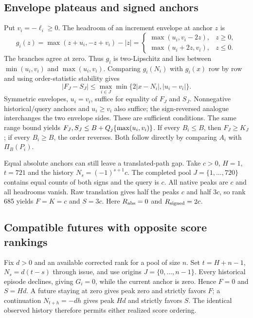 \subsection{Envelope plateaus and signed anchors}
Put $v_i=-\ell_i\ge0$. The headroom of an increment envelope at anchor $z$ is
\begin{equation}
g_i(z)=\max(z+u_i,-z+v_i)-|z|
=\begin{cases}\max(u_i,v_i-2z),&z\ge0,\\\max(u_i+2z,v_i),&z\le0.\end{cases}
\end{equation}
The branches agree at zero. Thus $g_i$ is two-Lipschitz and lies between $\min(u_i,v_i)$ and $\max(u_i,v_i)$. Comparing $g_i(N_i)$ with $g_i(x)$ row by row and using order-statistic stability gives
\begin{equation}
|F_J-S_J|\le\max_{i\in J}\min\{2|x-N_i|,|u_i-v_i|\}.
\end{equation}
Symmetric envelopes, $u_i=v_i$, suffice for equality of $F_J$ and $S_J$. Nonnegative historical/query anchors and $u_i\ge v_i$ also suffice; the sign-reversed analogue interchanges the two envelope sides. These are sufficient conditions. The same range bound yields $F_J,S_J\le B+Q_j\{\max(u_i,v_i)\}$. If every $B_i\le B$, then $F_J\ge K_J$; if every $B_i\ge B$, the order reverses. Both follow directly by comparing $A_i$ with $\Pi_B(P_i)$.

Equal absolute anchors can still leave a translated-path gap. Take $c>0$, $H=1$, $t=721$ and the history $N_s=(-1)^{s+1}c$. The completed pool $J=\{1,\ldots,720\}$ contains equal counts of both signs and the query is $c$. All native peaks are $c$ and all headrooms vanish. Raw translation gives half the peaks $c$ and half $3c$, so rank 685 yields $F=K=c$ and $S=3c$. Here $R_{\rm abs}=0$ and $R_{\rm signed}=2c$.

\subsection{Compatible futures with opposite score rankings}
Fix $d>0$ and an available corrected rank for a pool of size $n$. Set $t=H+n-1$, $N_s=d(t-s)$ through issue, and use origins $J=\{0,\ldots,n-1\}$. Every historical episode declines, giving $G_i=0$, while the current anchor is zero. Hence $F=0$ and $S=Hd$. A future staying at zero gives peak zero and strictly favors $F$; a continuation $N_{t+h}=-dh$ gives peak $Hd$ and strictly favors $S$. The identical observed history therefore permits either realized score ordering.

